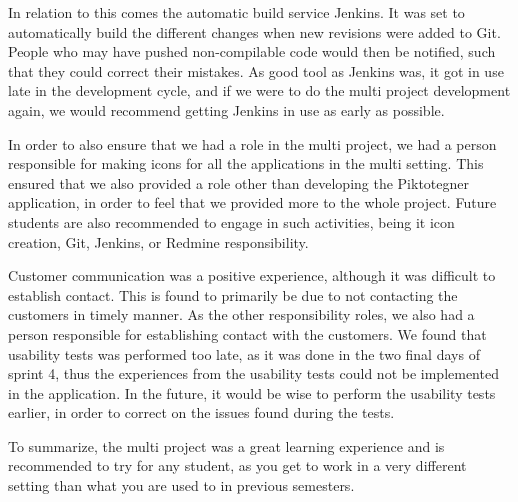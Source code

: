 In relation to this comes the automatic build service Jenkins. 
It was set to automatically build the different changes when new revisions were added to Git. 
People who may have pushed non-compilable code would then be notified, such that they could correct their mistakes.
As good tool as Jenkins was, it got in use late in the development cycle, and if we were to do the multi project development again, we would recommend getting Jenkins in use as early as possible.

In order to also ensure that we had a role in the multi project, we had a person responsible for making icons for all the applications in the multi setting.
This ensured that we also provided a role other than developing the Piktotegner application, in order to feel that we provided more to the whole project. 
Future students are also recommended to engage in such activities, being it icon creation, Git, Jenkins, or Redmine responsibility.

Customer communication was a positive experience, although it was difficult to establish contact.
This is found to primarily be due to not contacting the customers in timely manner.
As the other responsibility roles, we also had a person responsible for establishing contact with the customers.
We found that usability tests was performed too late, as it was done in the two final days of sprint 4, thus the experiences from the usability tests could not be implemented in the application.
In the future, it would be wise to perform the usability tests earlier, in order to correct on the issues found during the tests.

To summarize, the multi project was a great learning experience and is recommended to try for any student, as you get to work in a very different setting than what you are used to in previous semesters. 

% 

